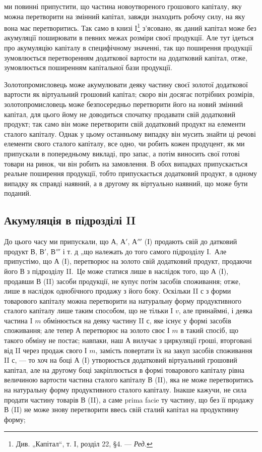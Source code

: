 \parcont{}  %
ми повинні припустити, що частина новоутвореного грошового капіталу,
яку можна перетворити на змінний капітал, завжди знаходить робочу
силу, на яку вона має перетворитись. Так само в книзі І\footnote*{
Див. „Капітал“, т. I, розділ 22, §4. — \emph{Ред.}
} з’ясовано,
як даний капітал може без акумуляції поширювати в певних межах розміри
своєї продукції. Але тут ідеться про акумуляцію капіталу в специфічному
значенні, так що поширення продукції зумовлюється перетворенням
додаткової вартости на додатковий капітал, отже, зумовлюється
поширенням капітальної бази продукції.

Золотопромисловець може акумулювати деяку частину своєї золотої
додаткової вартости як віртуальний грошовий капітал; скоро він досягає
потрібних розмірів, золотопромисловець може безпосередньо перетворити
його на новий змінний капітал, для цього йому не доводиться спочатку
продавати свій додатковий продукт; так само він може перетворити свій
додатковий продукт на елементи сталого капіталу. Однак у цьому останньому
випадку він мусить знайти ці речові елементи свого сталого капіталу,
все одно, чи робить кожен продуцент, як ми припускали в попередньому
викладі, про запас, а потім виносить свої готові товари на ринок,
чи він робить на замовлення. В обох випадках припускається реальне
поширення продукції, тобто припускається додатковий продукт, в
одному випадку як справді наявний, а в другому як віртуально наявний,
що може бути поданий.

\subsection{Акумуляція в підрозділі II}

До цього часу ми припускали, що $А$, $А'$, $А'''$ (І) продають свій до
датковий продукт $В$, $В'$, $В'''$ і т. д „що належать до того самого підрозділу
І.~Але припустімо, що $А$ (І), перетворює на золото свій додатковий
продукт, продаючи його $В$ з підрозділу II.~Це може статися
лише в наслідок того, що $А$ (І), продавши $В$ (II) засоби продукції,
не купує потім засобів споживання; отже, лише в наслідок однобічного
продажу з його боку. Оскільки II $с$ з форми товарового капіталу можна
перетворити на натуральну форму продуктивного сталого капіталу лише
таким способом, що не тільки I $v$, але принаймні, і деяка частина I $m$
обмінюється на деяку частину II $с$, яке існує у формі засобів споживання;
але тепер А перетворює на золото своє І $m$ в такий спосіб, що такого
обміну не постає; навпаки, наш $А$ вилучає з циркуляції гроші, вторговані
від II через продаж свого І $m$, замість повертати їх на закуп засобів
споживання II $с$, — то хоч на боці $А$ (І) утворюється додатковий
віртуальний грошовий капітал, але на другому боці закріплюється в формі
товарового капіталу рівна величиною вартости частина сталого капіталу
$В$ (II), яка не може перетворитись на натуральну форму продуктивного
сталого капіталу. Інакше кажучи, не сила продати частину товарів
$В$ (II), а саме prima facie ту частину, що без її продажу $В$ (II) не може
знову перетворити ввесь свій сталий капітал на продуктивну форму;
\parbreak{}  %
